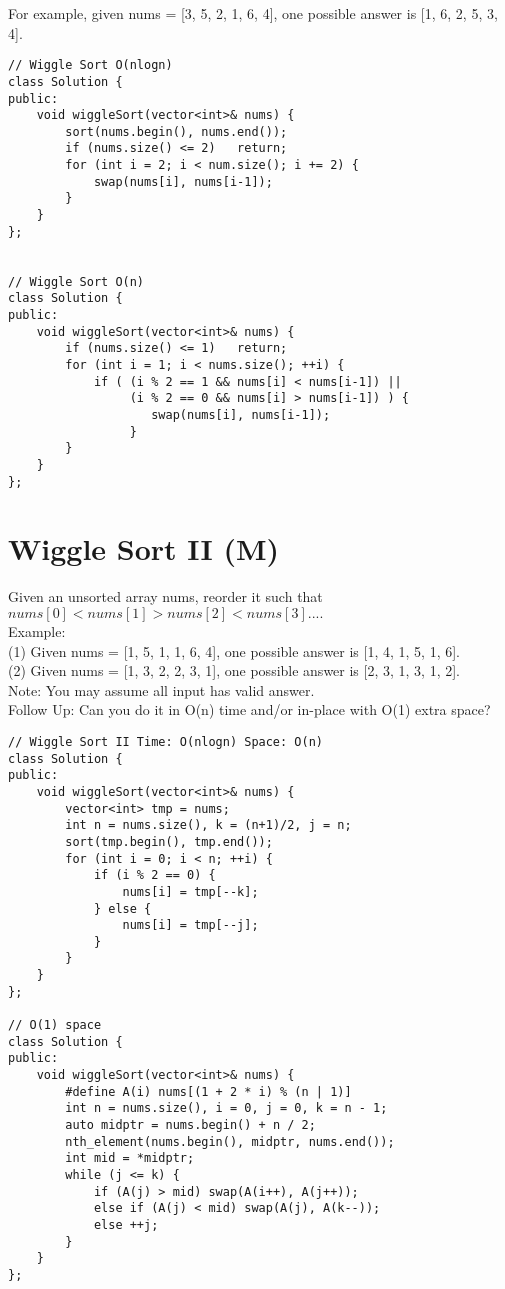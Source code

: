 For example, given nums = [3, 5, 2, 1, 6, 4], one possible answer is [1, 6, 2, 5, 3, 4].\\

\begin{lstlisting}
// Wiggle Sort O(nlogn)
class Solution {
public:
    void wiggleSort(vector<int>& nums) {
        sort(nums.begin(), nums.end());
        if (nums.size() <= 2)   return;
        for (int i = 2; i < num.size(); i += 2) {
            swap(nums[i], nums[i-1]);
        }
    }
};


// Wiggle Sort O(n)
class Solution {
public:
    void wiggleSort(vector<int>& nums) {
        if (nums.size() <= 1)   return;
        for (int i = 1; i < nums.size(); ++i) {
            if ( (i % 2 == 1 && nums[i] < nums[i-1]) ||
                 (i % 2 == 0 && nums[i] > nums[i-1]) ) {
                    swap(nums[i], nums[i-1]);
                 }
        }
    }
};
\end{lstlisting}


\section{Wiggle Sort II (M)}
Given an unsorted array nums, reorder it such that $nums[0] < nums[1] > nums[2] < nums[3]....$ \\

Example:\\
(1) Given nums = [1, 5, 1, 1, 6, 4], one possible answer is [1, 4, 1, 5, 1, 6]. \\
(2) Given nums = [1, 3, 2, 2, 3, 1], one possible answer is [2, 3, 1, 3, 1, 2].\\

Note: You may assume all input has valid answer.\\

Follow Up: Can you do it in O(n) time and/or in-place with O(1) extra space?\\

\begin{lstlisting}
// Wiggle Sort II Time: O(nlogn) Space: O(n)
class Solution {
public:
    void wiggleSort(vector<int>& nums) {
        vector<int> tmp = nums;
        int n = nums.size(), k = (n+1)/2, j = n;
        sort(tmp.begin(), tmp.end());
        for (int i = 0; i < n; ++i) {
            if (i % 2 == 0) {
                nums[i] = tmp[--k];
            } else {
                nums[i] = tmp[--j];
            }
        }
    }
};

// O(1) space
class Solution {
public:
    void wiggleSort(vector<int>& nums) {
        #define A(i) nums[(1 + 2 * i) % (n | 1)]
        int n = nums.size(), i = 0, j = 0, k = n - 1;
        auto midptr = nums.begin() + n / 2;
        nth_element(nums.begin(), midptr, nums.end());
        int mid = *midptr;
        while (j <= k) {
            if (A(j) > mid) swap(A(i++), A(j++));
            else if (A(j) < mid) swap(A(j), A(k--));
            else ++j;
        }
    }
};
\end{lstlisting}


